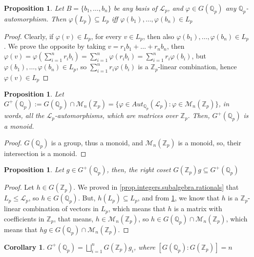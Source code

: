 \documentclass[12pt]{article}
\newtheorem{proposition}[theorem]{Proposition}
\newtheorem{corollary}[theorem]{Corollary}
\begin{document}
\begin{proposition}
\label{prop.integer.automorphism}
Let $B=\{b_1,\dots,b_n\}$ be any basis of $\mathcal{L}_p$, and $\varphi\in G(\mathbb{Q}_p)$ any $\mathbb{Q}_p$-automorphism. Then $\varphi(L_p)\subseteq L_p$ iff $\varphi(b_1),\dots,\varphi(b_n)\in L_p$
\end{proposition}
\begin{proof}
Clearly, if $\varphi(v)\in L_p$, for every $v\in L_p$, then also $\varphi(b_1),\dots,\varphi(b_n)\in L_p$. We prove the opposite by taking $v=r_1b_1+\dots+r_nb_n$, then $\varphi(v)=\varphi(\sum_{i=1}^nr_ib_i)=\sum_{i=1}^n\varphi(r_ib_i)=\sum_{i=1}^nr_i\varphi(b_i)$, but $\varphi(b_1),\dots,\varphi(b_n)\in L_p$, so $\sum_{i=1}^nr_i\varphi(b_i)$ is a $\mathbb{Z}_p$-linear combination, hence $\varphi(v)\in L_p$
\end{proof}
\begin{proposition}
\label{prop.monoid}
Let $G^{+}(\mathbb{Q}_p):=G(\mathbb{Q}_p)\cap\mathcal{M}_n(\mathbb{Z}_p)=\{\varphi\in Aut_{\mathbb{Q}_p}(\mathcal{L}_p) : \varphi\in\mathcal{M}_n(\mathbb{Z}_p)\}$, in words, all the $\mathcal{L}_p$-automorphisms, which are matrices over $\mathbb{Z}_p$. Then, $G^{+}(\mathbb{Q}_p)$ is a monoid.
\end{proposition}
\begin{proof}
$G(\mathbb{Q}_p)$ is a group, thus a monoid, and $\mathcal{M}_n(\mathbb{Z}_p)$ is a monoid, so, their intersection is a monoid.
\end{proof}
\begin{proposition}
\label{prop.right.coset}
Let $g\in G^{+}(\mathbb{Q}_p)$, then, the right coset $G(\mathbb{Z}_p)g\subseteq G^{+}(\mathbb{Q}_p)$
\end{proposition}
\begin{proof}
Let $h\in G(\mathbb{Z}_p)$. We proved in \ref{prop.integers.subalgebra.rationals} that $L_p\leq\mathcal{L}_p$, so $h\in G(\mathbb{Q}_p)$. But, $h(L_p)\subseteq L_p$, and from \ref{prop.integer.automorphism}, we know that $h$ is a $\mathbb{Z}_p$-linear combination of vectors in $L_p$, which means that $h$ is a matrix with coefficients in $\mathbb{Z}_p$, that means, $h\in\mathcal{M}_n(\mathbb{Z}_p)$, so $h\in G({\mathbb
{Q}_p})\cap\mathcal{M}_n(\mathbb{Z}_p)$, which means that $hg\in G({\mathbb
{Q}_p})\cap\mathcal{M}_n(\mathbb{Z}_p)$.
\end{proof}
\begin{corollary}
\label{cor.coset.union}
$G^+(\mathbb{Q}_p)=\bigsqcup_{i=1}^n G(\mathbb{Z}_p)g_i$, where $[G(\mathbb{Q}_p):G(\mathbb{Z}_p)]=n$
\end{corollary}
\end{document}
